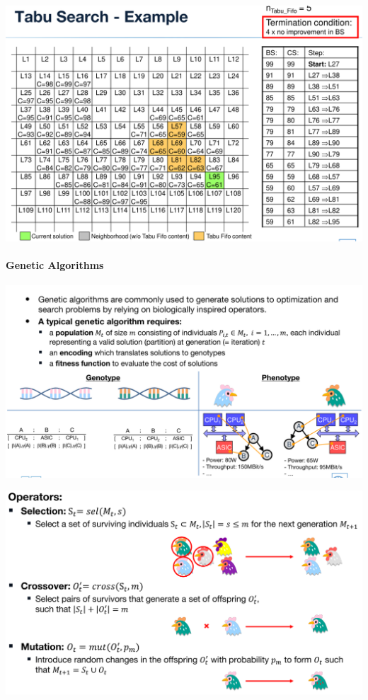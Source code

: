\documentclass[english]{latex4ei/latex4ei_sheet}
\begin{document}
\begin{center}
  \centering
  \includegraphics[width=\linewidth]{assets/TabuExample.png}
  \label{fig:tabuexample}
\end{center}

\paragraph{Genetic Algorithms}

\begin{center}
  \centering
  \includegraphics[width=\linewidth]{assets/GeneticAlgortihm.png}
  \label{fig:geneticalgortihm}
\end{center}

\begin{center}
  \centering
  \includegraphics[width=0.8\linewidth]{assets/GeneticOperators.png}
  \label{fig:geneticoperators}
\end{center}
\end{document}
